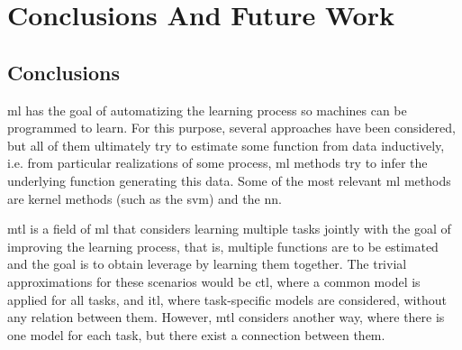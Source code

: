 
\chapter{Conclusions And Future Work} %
\label{ChapterConclusions}

\section{Conclusions}
%
\acrfull{ml} has the goal of automatizing the learning process so machines can be programmed to learn. For this purpose, several approaches have been considered, but all of them ultimately try to estimate some function from data inductively, i.e. from particular realizations of some process, \acrshort{ml} methods try to infer the underlying function generating this data. Some of the most relevant \acrshort{ml} methods are kernel methods (such as the \acrfull{svm}) and the \acrshort{nn}.

\acrfull{mtl} is a field of \acrshort{ml} that considers learning multiple tasks jointly with the goal of improving the learning process, that is, multiple functions are to be estimated and the goal is to obtain leverage by learning them together. The trivial approximations for these scenarios would be \acrfull{ctl}, where a common model is applied for all tasks, and \acrfull{itl}, where task-specific models are considered, without any relation between them. However, \acrshort{mtl} considers another way, where there is one model for each task, but there exist a connection between them.

